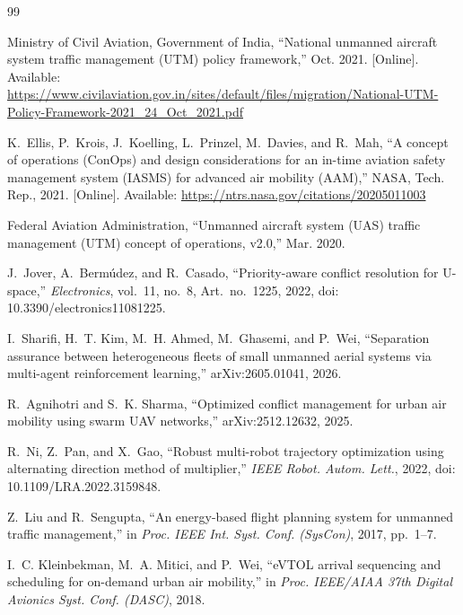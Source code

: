 \documentclass[journal]{IEEEtran}
\begin{document}
\begin{thebibliography}{99}

Ministry of Civil Aviation, Government of India, ``National unmanned aircraft system traffic management (UTM) policy framework,'' Oct. 2021. [Online]. Available: \url{https://www.civilaviation.gov.in/sites/default/files/migration/National-UTM-Policy-Framework-2021_24_Oct_2021.pdf}

K.~Ellis, P.~Krois, J.~Koelling, L.~Prinzel, M.~Davies, and R.~Mah, ``A concept of operations (ConOps) and design considerations for an in-time aviation safety management system (IASMS) for advanced air mobility (AAM),'' NASA, Tech. Rep., 2021. [Online]. Available: \url{https://ntrs.nasa.gov/citations/20205011003}

Federal Aviation Administration, ``Unmanned aircraft system (UAS) traffic management (UTM) concept of operations, v2.0,'' Mar. 2020.

J.~Jover, A.~Berm\'udez, and R.~Casado, ``Priority-aware conflict resolution for U-space,'' \textit{Electronics}, vol.~11, no.~8, Art.~no.~1225, 2022, doi: 10.3390/electronics11081225.

I.~Sharifi, H.~T. Kim, M.~H. Ahmed, M.~Ghasemi, and P.~Wei, ``Separation assurance between heterogeneous fleets of small unmanned aerial systems via multi-agent reinforcement learning,'' arXiv:2605.01041, 2026.

R.~Agnihotri and S.~K. Sharma, ``Optimized conflict management for urban air mobility using swarm UAV networks,'' arXiv:2512.12632, 2025.

R.~Ni, Z.~Pan, and X.~Gao, ``Robust multi-robot trajectory optimization using alternating direction method of multiplier,'' \textit{IEEE Robot. Autom. Lett.}, 2022, doi: 10.1109/LRA.2022.3159848.

Z.~Liu and R.~Sengupta, ``An energy-based flight planning system for unmanned traffic management,'' in \textit{Proc. IEEE Int. Syst. Conf. (SysCon)}, 2017, pp.~1--7.

I.~C. Kleinbekman, M.~A. Mitici, and P.~Wei, ``eVTOL arrival sequencing and scheduling for on-demand urban air mobility,'' in \textit{Proc. IEEE/AIAA 37th Digital Avionics Syst. Conf. (DASC)}, 2018.


\end{thebibliography}
\end{document}
